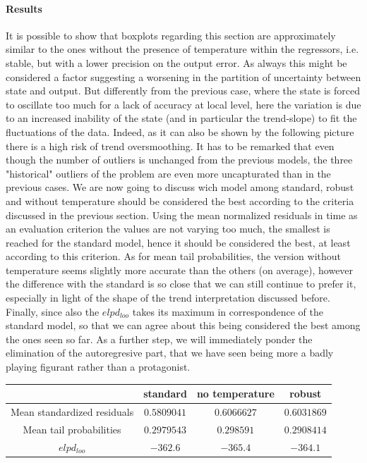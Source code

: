 \documentclass[11pt,twoside]{report}
\begin{document}
\paragraph{Results}
It is possible to show that boxplots regarding this section are approximately similar to the ones without the presence of temperature within the regressors, i.e. stable, but with a lower precision on the output error. As always this might be considered a factor suggesting a worsening in the partition of uncertainty between state and output. But differently from the previous case, where the state is forced to oscillate too much for a lack of accuracy at local level, here the variation is due to an increased inability of the state (and in particular the trend-slope) to fit the fluctuations of the data. Indeed, as it can also be shown by the following picture there is a high risk of trend oversmoothing.
It has to be remarked that even though the number of outliers is unchanged from the previous models, the three "historical" outliers of the problem are even more uncapturated than in the previous cases. We are now going to discuss wich model among standard, robust and without temperature should be considered the best according to the criteria discussed in the previous section. Using the mean normalized residuals in time as an evaluation criterion the values are not varying too much, the smallest is reached for the standard model, hence it should be considered the best, at least according to this criterion. As for mean tail probabilities, the version without temperature seems slightly more accurate than the others (on average), however the difference with the standard is so close that we can still continue to prefer it, especially in light of the shape of the trend interpretation discussed before. Finally, since also the $ elpd_{loo} $ takes its maximum in correspondence of the standard model, so that we can agree about this being considered the best among the ones seen so far. As a further step, we will immediately ponder the elimination  of the autoregresive part, that we have seen being more a badly playing figurant rather than a protagonist.

\begin{table}[!htb]
		\centering
		\begin{tabular}{|c|c|c|c|}
			\hline
			& standard & no temperature & robust \\
			\hline
			Mean standardized residuals &$  0.5809041 $ & $  0.6066627 $ &$  0.6031869 $\\
			\hline
			Mean tail probabilities &$ 0.2979543 $ & $  0.298591 $ &$  0.2908414 $\\
			\hline
			$ elpd_{loo} $ &$ -362.6 $ & $  -365.4 $ &$  -364.1 $\\
			\hline
		\end{tabular}
\end{table}
\end{document}
